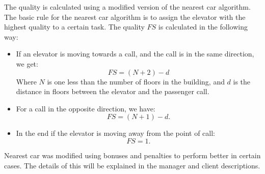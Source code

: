 \documentclass[a4paper,10pt,twocolumn]{article}
\begin{document}
The quality is calculated using a modified version of the nearest car algorithm. The basic rule for the nearest car algorithm is to assign the elevator with the highest quality to a certain task. The quality $FS$ is calculated in the following way:
\begin{itemize}
 \item If an elevator is moving towards a call, and the call is in the same direction, we get:
\begin{equation}
 FS = (N + 2) - d
\end{equation}
 Where $N$ is one less than the number of floors in the building, and $d$ is the distance in floors between the elevator and the passenger call.
 \item For a call in the opposite direction, we have:
\begin{equation}
 FS = (N + 1) - d.
\end{equation}
 \item In the end if the elevator is moving away from the point of call: 
 \begin{equation}
  FS = 1.
 \end{equation}
\end{itemize}
Nearest car was modified using bonuses and penalties to perform better in certain cases. The details of this will be explained in the manager and client descriptions.
\end{document}
